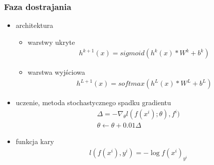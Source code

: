\documentclass{beamer}
\begin{document}
\begin{frame}
\frametitle{Faza dostrajania}
\begin{itemize}
    \item architektura
        \begin{itemize}
            \item warstwy ukryte
            \begin{align*}
                &h^{k+1}(x) = sigmoid(h^{k}(x)*W^{k}+b^{k})
            \end{align*}
            \item warstwa wyjściowa
            \begin{align*}
                &h^{L+1}(x) = softmax(h^{L}(x)*W^{L}+b^{L})
            \end{align*}
        \end{itemize}
    \item uczenie, metoda stochastycznego spadku gradientu
        \begin{align*}
            &\Delta = - \nabla_{\theta} l(f(x^{i}); \theta ), f^{i}) \\
            &\theta \leftarrow  \theta + 0.01 \Delta   
        \end{align*}
    \item funkcja kary
        \begin{align*}
            &l(f(x^{i}), y^{i})= -\log f(x^{i})_{y^{i}} 
        \end{align*}
\end{itemize}

\end{frame}

\end{document}
